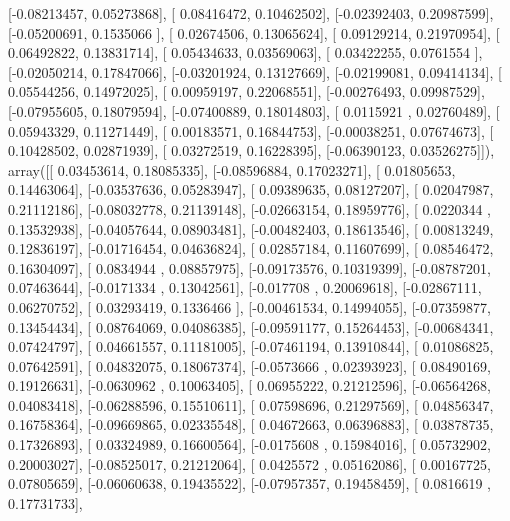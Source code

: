 \documentclass{article}
\begin{document}
       [-0.08213457,  0.05273868],
       [ 0.08416472,  0.10462502],
       [-0.02392403,  0.20987599],
       [-0.05200691,  0.1535066 ],
       [ 0.02674506,  0.13065624],
       [ 0.09129214,  0.21970954],
       [ 0.06492822,  0.13831714],
       [ 0.05434633,  0.03569063],
       [ 0.03422255,  0.0761554 ],
       [-0.02050214,  0.17847066],
       [-0.03201924,  0.13127669],
       [-0.02199081,  0.09414134],
       [ 0.05544256,  0.14972025],
       [ 0.00959197,  0.22068551],
       [-0.00276493,  0.09987529],
       [-0.07955605,  0.18079594],
       [-0.07400889,  0.18014803],
       [ 0.0115921 ,  0.02760489],
       [ 0.05943329,  0.11271449],
       [ 0.00183571,  0.16844753],
       [-0.00038251,  0.07674673],
       [ 0.10428502,  0.02871939],
       [ 0.03272519,  0.16228395],
       [-0.06390123,  0.03526275]]), array([[ 0.03453614,  0.18085335],
       [-0.08596884,  0.17023271],
       [ 0.01805653,  0.14463064],
       [-0.03537636,  0.05283947],
       [ 0.09389635,  0.08127207],
       [ 0.02047987,  0.21112186],
       [-0.08032778,  0.21139148],
       [-0.02663154,  0.18959776],
       [ 0.0220344 ,  0.13532938],
       [-0.04057644,  0.08903481],
       [-0.00482403,  0.18613546],
       [ 0.00813249,  0.12836197],
       [-0.01716454,  0.04636824],
       [ 0.02857184,  0.11607699],
       [ 0.08546472,  0.16304097],
       [ 0.0834944 ,  0.08857975],
       [-0.09173576,  0.10319399],
       [-0.08787201,  0.07463644],
       [-0.0171334 ,  0.13042561],
       [-0.017708  ,  0.20069618],
       [-0.02867111,  0.06270752],
       [ 0.03293419,  0.1336466 ],
       [-0.00461534,  0.14994055],
       [-0.07359877,  0.13454434],
       [ 0.08764069,  0.04086385],
       [-0.09591177,  0.15264453],
       [-0.00684341,  0.07424797],
       [ 0.04661557,  0.11181005],
       [-0.07461194,  0.13910844],
       [ 0.01086825,  0.07642591],
       [ 0.04832075,  0.18067374],
       [-0.0573666 ,  0.02393923],
       [ 0.08490169,  0.19126631],
       [-0.0630962 ,  0.10063405],
       [ 0.06955222,  0.21212596],
       [-0.06564268,  0.04083418],
       [-0.06288596,  0.15510611],
       [ 0.07598696,  0.21297569],
       [ 0.04856347,  0.16758364],
       [-0.09669865,  0.02335548],
       [ 0.04672663,  0.06396883],
       [ 0.03878735,  0.17326893],
       [ 0.03324989,  0.16600564],
       [-0.0175608 ,  0.15984016],
       [ 0.05732902,  0.20003027],
       [-0.08525017,  0.21212064],
       [ 0.0425572 ,  0.05162086],
       [ 0.00167725,  0.07805659],
       [-0.06060638,  0.19435522],
       [-0.07957357,  0.19458459],
       [ 0.0816619 ,  0.17731733],
\end{document}
